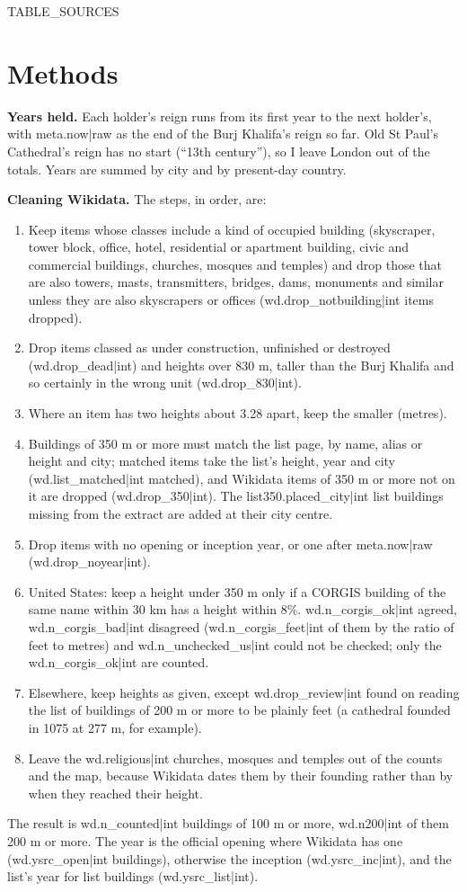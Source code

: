 \documentclass[11pt,a4paper]{article}
\begin{document}
{{TABLE_SOURCES}}

\section{Methods}
\textbf{Years held.} Each holder's reign runs from its first year to the next holder's, with {{meta.now|raw}} as the end of the Burj Khalifa's reign so far. Old St Paul's Cathedral's reign has no start (``13th century''), so I leave London out of the totals. Years are summed by city and by present-day country.

\textbf{Cleaning Wikidata.} The steps, in order, are:
\begin{enumerate}
\item Keep items whose classes include a kind of occupied building (skyscraper, tower block, office, hotel, residential or apartment building, civic and commercial buildings, churches, mosques and temples) and drop those that are also towers, masts, transmitters, bridges, dams, monuments and similar unless they are also skyscrapers or offices ({{wd.drop_notbuilding|int}} items dropped).
\item Drop items classed as under construction, unfinished or destroyed ({{wd.drop_dead|int}}) and heights over 830 m, taller than the Burj Khalifa and so certainly in the wrong unit ({{wd.drop_830|int}}).
\item Where an item has two heights about 3.28 apart, keep the smaller (metres).
\item Buildings of 350 m or more must match the list page, by name, alias or height and city; matched items take the list's height, year and city ({{wd.list_matched|int}} matched), and Wikidata items of 350 m or more not on it are dropped ({{wd.drop_350|int}}). The {{list350.placed_city|int}} list buildings missing from the extract are added at their city centre.
\item Drop items with no opening or inception year, or one after {{meta.now|raw}} ({{wd.drop_noyear|int}}).
\item United States: keep a height under 350 m only if a CORGIS building of the same name within 30 km has a height within 8\%. {{wd.n_corgis_ok|int}} agreed, {{wd.n_corgis_bad|int}} disagreed ({{wd.n_corgis_feet|int}} of them by the ratio of feet to metres) and {{wd.n_unchecked_us|int}} could not be checked; only the {{wd.n_corgis_ok|int}} are counted.
\item Elsewhere, keep heights as given, except {{wd.drop_review|int}} found on reading the list of buildings of 200 m or more to be plainly feet (a cathedral founded in 1075 at 277 m, for example).
\item Leave the {{wd.religious|int}} churches, mosques and temples out of the counts and the map, because Wikidata dates them by their founding rather than by when they reached their height.
\end{enumerate}
The result is {{wd.n_counted|int}} buildings of 100 m or more, {{wd.n200|int}} of them 200 m or more. The year is the official opening where Wikidata has one ({{wd.ysrc_open|int}} buildings), otherwise the inception ({{wd.ysrc_inc|int}}), and the list's year for list buildings ({{wd.ysrc_list|int}}).
\end{document}
